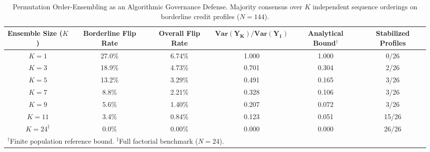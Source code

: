 \begin{table}[t]
\centering
\caption{Permutation Order-Ensembling as an Algorithmic Governance Defense. Majority consensus over $K$ independent sequence orderings on borderline credit profiles ($N=144$).}
\label{tab:order_ensemble_mitigation}
\vspace{2pt}
\scriptsize
\setlength{\tabcolsep}{4.5pt}
\begin{tabular}{@{}cccccc@{}}
\toprule
\textbf{Ensemble Size ($K$)} & \textbf{Borderline Flip Rate} & \textbf{Overall Flip Rate} & $\mathbf{\text{Var}(Y_K)/\text{Var}(Y_1)}$ & \textbf{Analytical Bound}$^\dagger$ & \textbf{Stabilized Profiles} \\
\midrule
$K = 1$ & 27.0\% & 6.74\% & 1.000 & 1.000 & 0/26 \\
$K = 3$ & 18.9\% & 4.73\% & 0.701 & 0.304 & 2/26 \\
$K = 5$ & 13.2\% & 3.29\% & 0.491 & 0.165 & 3/26 \\
$K = 7$ & 8.8\% & 2.21\% & 0.328 & 0.106 & 3/26 \\
$K = 9$ & 5.6\% & 1.40\% & 0.207 & 0.072 & 3/26 \\
$K = 11$ & 3.4\% & 0.84\% & 0.123 & 0.051 & 15/26 \\
$K = 24^\ddagger$ & 0.0\% & 0.00\% & 0.000 & 0.000 & 26/26 \\
\bottomrule
\multicolumn{6}{l}{\vspace{2pt}\footnotesize $^\dagger$Finite population reference bound. $^\ddagger$Full factorial benchmark ($N=24$).}
\end{tabular}
\end{table}